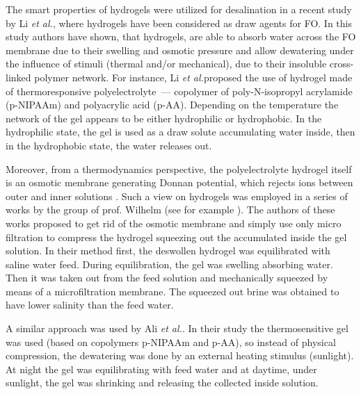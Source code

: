 \documentclass[journal,article,submit,pdftex,moreauthors]{Definitions/mdpi}
\newcommand{\etal}{\textit{et al.}{}}
\begin{document}
The smart properties of hydrogels were utilized for desalination in a recent study by Li \etal \cite{Li2011}, where hydrogels have been considered as draw agents for FO. 
In this study authors have shown, that hydrogels, 
are able to absorb water across the FO membrane due to their swelling and osmotic pressure and
allow dewatering under the influence of stimuli (thermal and/or mechanical), due to their insoluble cross-linked polymer network.
For instance, Li \etal proposed the use of hydrogel made of thermoresponsive polyelectrolyte~--- copolymer of poly-N-isopropyl acrylamide (p-NIPAAm) and polyacrylic acid (p-AA).
Depending on the temperature the network of the gel appears to be either hydrophilic or hydrophobic. 
In the hydrophilic state, the gel is used as a draw solute accumulating water inside, then in the hydrophobic state, the water releases out.

Moreover, from a thermodynamics perspective, the polyelectrolyte hydrogel itself is an osmotic membrane generating Donnan potential, which rejects ions between outer and inner solutions \cite{Wang_2014}. 
Such a view on hydrogels was employed in a series of works by the group of prof. Wilhelm (see for example \cite{Arens_2017,Fengler_2020}). 
The authors of these works proposed to get rid of the osmotic membrane and simply use only micro filtration to compress the hydrogel squeezing out the accumulated inside the gel solution. 
In their method first, the deswollen hydrogel was equilibrated with saline water feed. 
During equilibration, the gel was swelling absorbing water. 
Then it was taken out from the feed solution and mechanically squeezed by means of a microfiltration membrane. 
The squeezed out brine was obtained to have lower salinity than the feed water. 

A similar approach was used by Ali \etal \cite{Ali2015}. 
In their study the thermosensitive gel was used (based on copolymers p-NIPAAm and p-AA), so instead of physical compression, the dewatering was done by an external heating stimulus (sunlight). 
At night the gel was equilibrating with feed water and at daytime, under sunlight, the gel was shrinking and releasing the collected inside solution. 
\end{document}
